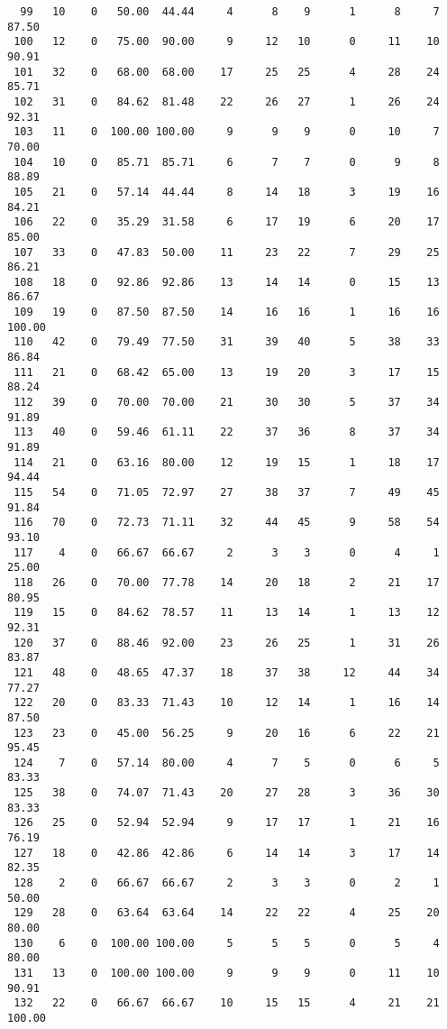 \begin{verbatim}
  99   10    0   50.00  44.44     4      8    9      1      8     7    87.50
 100   12    0   75.00  90.00     9     12   10      0     11    10    90.91
 101   32    0   68.00  68.00    17     25   25      4     28    24    85.71
 102   31    0   84.62  81.48    22     26   27      1     26    24    92.31
 103   11    0  100.00 100.00     9      9    9      0     10     7    70.00
 104   10    0   85.71  85.71     6      7    7      0      9     8    88.89
 105   21    0   57.14  44.44     8     14   18      3     19    16    84.21
 106   22    0   35.29  31.58     6     17   19      6     20    17    85.00
 107   33    0   47.83  50.00    11     23   22      7     29    25    86.21
 108   18    0   92.86  92.86    13     14   14      0     15    13    86.67
 109   19    0   87.50  87.50    14     16   16      1     16    16   100.00
 110   42    0   79.49  77.50    31     39   40      5     38    33    86.84
 111   21    0   68.42  65.00    13     19   20      3     17    15    88.24
 112   39    0   70.00  70.00    21     30   30      5     37    34    91.89
 113   40    0   59.46  61.11    22     37   36      8     37    34    91.89
 114   21    0   63.16  80.00    12     19   15      1     18    17    94.44
 115   54    0   71.05  72.97    27     38   37      7     49    45    91.84
 116   70    0   72.73  71.11    32     44   45      9     58    54    93.10
 117    4    0   66.67  66.67     2      3    3      0      4     1    25.00
 118   26    0   70.00  77.78    14     20   18      2     21    17    80.95
 119   15    0   84.62  78.57    11     13   14      1     13    12    92.31
 120   37    0   88.46  92.00    23     26   25      1     31    26    83.87
 121   48    0   48.65  47.37    18     37   38     12     44    34    77.27
 122   20    0   83.33  71.43    10     12   14      1     16    14    87.50
 123   23    0   45.00  56.25     9     20   16      6     22    21    95.45
 124    7    0   57.14  80.00     4      7    5      0      6     5    83.33
 125   38    0   74.07  71.43    20     27   28      3     36    30    83.33
 126   25    0   52.94  52.94     9     17   17      1     21    16    76.19
 127   18    0   42.86  42.86     6     14   14      3     17    14    82.35
 128    2    0   66.67  66.67     2      3    3      0      2     1    50.00
 129   28    0   63.64  63.64    14     22   22      4     25    20    80.00
 130    6    0  100.00 100.00     5      5    5      0      5     4    80.00
 131   13    0  100.00 100.00     9      9    9      0     11    10    90.91
 132   22    0   66.67  66.67    10     15   15      4     21    21   100.00

\end{verbatim}
